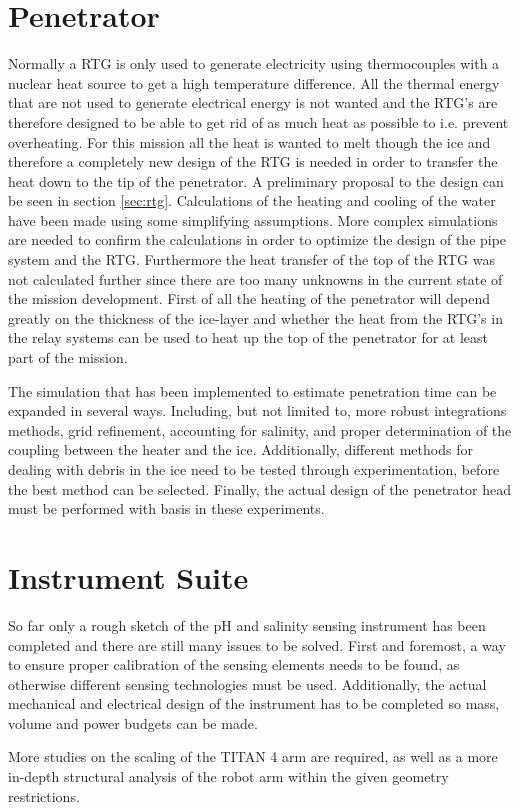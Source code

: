 \section{Penetrator}

Normally a RTG is only used to generate electricity using thermocouples with a nuclear heat source to get a high temperature difference. All the thermal energy that are not used to generate electrical energy is not wanted and the RTG's are therefore designed to be able to get rid of as much heat as possible to i.e. prevent overheating. For this mission all the heat is wanted to melt though the ice and therefore a completely new design of the RTG is needed in order to transfer the heat down to the tip of the penetrator. A preliminary proposal to the design can be seen in section \ref{sec:rtg}. Calculations of the heating and cooling of the water have been made using some simplifying assumptions. More complex simulations are needed to confirm the calculations in order to optimize the design of the pipe system and the RTG. Furthermore the heat transfer of the top of the RTG was not calculated further since there are too many unknowns in the current state of the mission development. First of all the heating of the penetrator will depend greatly on the thickness of the ice-layer and whether the heat from the RTG's in the relay systems can be used to heat up the top of the penetrator for at least part of the mission.

The simulation that has been implemented to estimate penetration time can be expanded in several ways. Including, but not limited to, more robust integrations methods, grid refinement, accounting for salinity, and proper determination of the coupling between the heater and the ice. Additionally, different methods for dealing with debris in the ice need to be tested through experimentation, before the best method can be selected. Finally, the actual design of the penetrator head must be performed with basis in these experiments.

\section{Instrument Suite}
	
So far only a rough sketch of the pH and salinity sensing instrument has been completed and there are still many issues to be solved. First and foremost, a way to ensure proper calibration of the sensing elements needs to be found, as otherwise different sensing technologies must be used. Additionally, the actual mechanical and electrical design of the instrument has to be completed so mass, volume and power budgets can be made.

More studies on the scaling of the TITAN 4 arm are required, as well as a more in-depth structural analysis of the robot arm within the given geometry restrictions.


